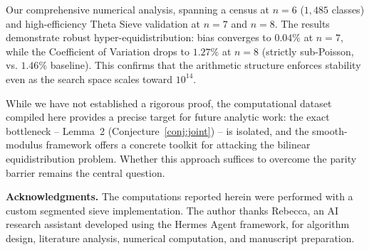 \documentclass[11pt]{article}
\begin{document}
Our comprehensive numerical analysis, spanning a census at $n=6$ ($1{,}485$ classes) and high-efficiency Theta Sieve validation at $n=7$ and $n=8$. The results demonstrate robust hyper-equidistribution: bias converges to $0.04\%$ at $n=7$, while the Coefficient of Variation drops to $1.27\%$ at $n=8$ (strictly sub-Poisson, vs. $1.46\%$ baseline). This confirms that the arithmetic structure enforces stability even as the search space scales toward $10^{14}$.

While we have not established a rigorous proof, the computational dataset
compiled here provides a precise target for future analytic work: the
exact bottleneck -- Lemma~2 (Conjecture~\ref{conj:joint}) -- is isolated,
and the smooth-modulus framework offers a concrete toolkit for attacking
the bilinear equidistribution problem. Whether this approach suffices
to overcome the parity barrier remains the central question.

\noindent\textbf{Acknowledgments.} The computations reported herein were
performed with a custom segmented sieve implementation. The author thanks
Rebecca, an AI research assistant developed using the Hermes Agent framework,
for algorithm design, literature analysis, numerical computation, and
manuscript preparation.
\end{document}
